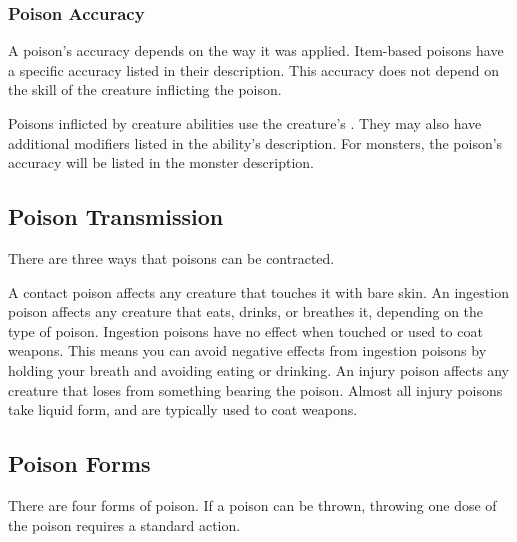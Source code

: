     \subsubsection{Poison Accuracy}
      A poison's accuracy depends on the way it was applied.
      Item-based poisons have a specific accuracy listed in their description.
      This accuracy does not depend on the skill of the creature inflicting the poison.

      Poisons inflicted by creature abilities use the creature's .
      They may also have additional modifiers listed in the ability's description.
      For monsters, the poison's accuracy will be listed in the monster description.

  \subsection{Poison Transmission}\label{Poison Transmission}\label{Transmission}

    There are three ways that poisons can be contracted.

     A contact poison affects any creature that touches it with bare skin.
     An ingestion poison affects any creature that eats, drinks, or breathes it, depending on the type of poison.
    Ingestion poisons have no effect when touched or used to coat weapons.
    This means you can avoid negative effects from ingestion poisons by holding your breath and avoiding eating or drinking.
     An injury poison affects any creature that loses  from something bearing the poison.
    Almost all injury poisons take liquid form, and are typically used to coat weapons.

  \subsection{Poison Forms}\label{Poison Forms}

    There are four forms of poison.
    If a poison can be thrown, throwing one dose of the poison requires a standard action.

